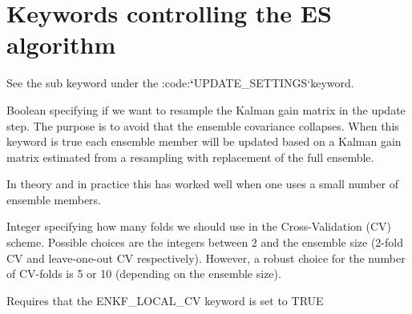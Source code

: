 \documentclass[a4paper,10pt,english]{sphinxmanual}
\begin{document}
\section{Keywords controlling the ES algorithm}
\label{\detokenize{keywords/index:keywords-controlling-the-es-algorithm}}\label{\detokenize{keywords/index:id7}}\label{\detokenize{keywords/index:enkf-alpha}}
See the sub keyword  under the :code:{\color{red}\bfseries{}{}`}UPDATE\_SETTINGS{}`keyword.

\label{\detokenize{keywords/index:enkf-bootstrap}}
\begin{sphinxShadowBox}

Boolean specifying if we want to resample the Kalman gain matrix in the update
step. The purpose is to avoid that the ensemble covariance collapses. When
this keyword is true each ensemble member will be updated based on a Kalman
gain matrix estimated from a resampling with replacement of the full ensemble.

In theory and in practice this has worked well when one uses a small number of
ensemble members.
\end{sphinxShadowBox}
\label{\detokenize{keywords/index:enkf-cv-folds}}
\begin{sphinxShadowBox}

Integer specifying how many folds we should use in the Cross-Validation (CV)
scheme. Possible choices are the integers between 2 and the ensemble size
(2-fold CV and leave-one-out CV respectively). However, a robust choice for
the number of CV-folds is 5 or 10 (depending on the ensemble size).


%
\begin{sphinxVerbatim}[commandchars=\\\{\}]
         
 
\end{sphinxVerbatim}

Requires that the ENKF\_LOCAL\_CV keyword is set to TRUE
\end{sphinxShadowBox}
\label{\detokenize{keywords/index:enkf-force-ncomp}}
\end{document}
